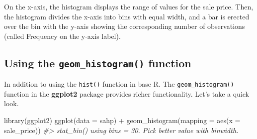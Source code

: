 \documentclass[
]{book}
\newenvironment{Shaded}{\begin{snugshade}}{\end{snugshade}}
\newcommand{\AttributeTok}[1]{\textcolor[rgb]{0.77,0.63,0.00}{#1}}
\newcommand{\CommentTok}[1]{\textcolor[rgb]{0.56,0.35,0.01}{\textit{#1}}}
\newcommand{\DecValTok}[1]{\textcolor[rgb]{0.00,0.00,0.81}{#1}}
\newcommand{\FloatTok}[1]{\textcolor[rgb]{0.00,0.00,0.81}{#1}}
\newcommand{\FunctionTok}[1]{\textcolor[rgb]{0.00,0.00,0.00}{#1}}
\newcommand{\NormalTok}[1]{#1}
\newcommand{\SpecialCharTok}[1]{\textcolor[rgb]{0.00,0.00,0.00}{#1}}
\begin{document}
\begin{Shaded}
\end{Shaded}

On the x-axis, the histogram displays the range of values for the sale price. Then, the histogram divides the x-axis into bins with equal width, and a bar is erected over the bin with the y-axis showing the corresponding number of observations (called Frequency on the y-axis label).

\hypertarget{using-the-geom_histogram-function}{%
\subsection{\texorpdfstring{Using the \texttt{geom\_histogram()} function}{Using the geom\_histogram() function}}\label{using-the-geom_histogram-function}}

In addition to using the \texttt{hist()} function in base R. The \texttt{geom\_histogram()} function in the \textbf{ggplot2} package provides richer functionality. Let's take a quick look.

\begin{Shaded}
\begin{Highlighting}[]
\FunctionTok{library}\NormalTok{(ggplot2)}
\FunctionTok{ggplot}\NormalTok{(}\AttributeTok{data =}\NormalTok{ sahp) }\SpecialCharTok{+} \FunctionTok{geom\_histogram}\NormalTok{(}\AttributeTok{mapping =} \FunctionTok{aes}\NormalTok{(}\AttributeTok{x =}\NormalTok{ sale\_price))}
\CommentTok{\#\textgreater{} \textasciigrave{}stat\_bin()\textasciigrave{} using \textasciigrave{}bins = 30\textasciigrave{}. Pick better value with \textasciigrave{}binwidth\textasciigrave{}.}
\end{Highlighting}
\end{Shaded}
\end{document}
